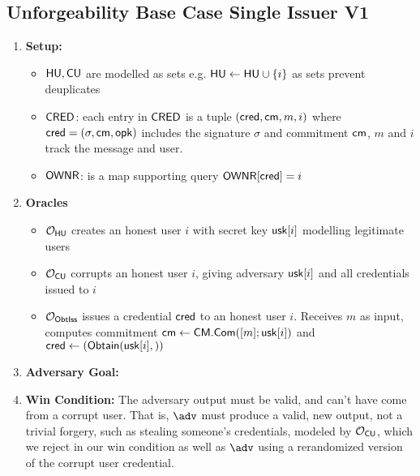 \subsection{Unforgeability Base Case Single Issuer V1}
\begin{enumerate}
    \item \textbf{Setup:}
    \begin{itemize}
        \item $\mathsf{HU}, \mathsf{CU}$ are modelled as sets e.g. $\mathsf{HU} \gets \mathsf{HU} \cup \{i\}$ as sets prevent deuplicates
        \item $\mathsf{CRED}$: each entry in $\mathsf{CRED}$ is a tuple $(\mathsf{cred}, \mathsf{cm}, m, i)$ where $\mathsf{cred} = (\sigma, \mathsf{cm}, \mathsf{opk})$ includes the signature $\sigma$ and commitment $\mathsf{cm}$, $m$ and $i$ track the message and user. 
        \item $\mathsf{OWNR}$: is a map supporting query $\mathsf{OWNR}[\mathsf{cred}] = i$
    \end{itemize}
    \item \textbf{Oracles}
    \begin{itemize}
        \item $\mathcal{O}_{\mathsf{HU}}$ creates an honest user $i$ with secret key $\mathsf{usk}[i]$ modelling legitimate users
        \item $\mathcal{O}_{\mathsf{CU}}$ corrupts an honest user $i$, giving adversary $\mathsf{usk}[i]$ and all credentials issued to $i$
        \item $\mathcal{O}_{\mathsf{ObtIss}}$ issues a credential $\mathsf{cred}$ to an honest user $i$. Receives $m$ as input, computes commitment $\mathsf{cm} \gets \mathsf{CM.Com}([m]; \mathsf{usk}[i])$ and $\mathsf{cred} \gets (\mathsf{Obtain}(\mathsf{usk}[i],))$
    \end{itemize}
    \item \textbf{Adversary Goal: } 
    \item \textbf{Win Condition: } The adversary output must be valid, and can't have come from a corrupt user. That is,
    $\adv$ must produce a valid, new output, not a trivial forgery, such as stealing someone's credentials, modeled by $\mathcal{O}_{\mathsf{CU}}$, which we reject in our win condition as well as $\adv$ using a rerandomized version of the corrupt user credential. 
\end{enumerate}

